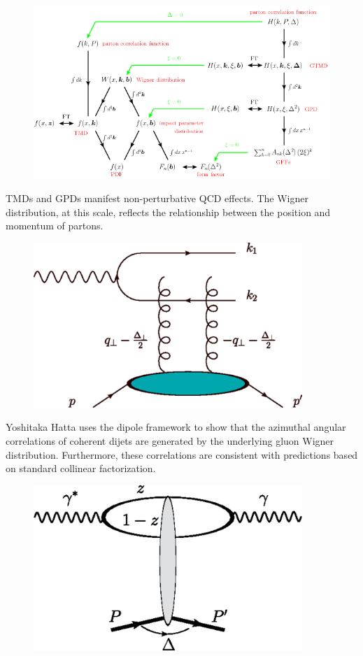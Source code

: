 \begin{figure}[h!]
\begin{centering}
\includegraphics[width=7in]{Chapter2/importfigs/fig6_introGPD_TMD.png}
\par\end{centering}
\end{figure}

TMDs and GPDs manifest non-perturbative QCD effects. The Wigner distribution, at this scale, reflects the relationship between the position and momentum of partons.

\begin{figure}[h!]
\begin{centering}
\includegraphics[width=4in]{Chapter2/importfigs/fig4_yatta.png}
\par\end{centering}
\end{figure}

Yoshitaka Hatta uses the dipole framework to show that the azimuthal angular correlations of coherent dijets are generated by the underlying gluon Wigner distribution. Furthermore, these correlations are consistent with predictions based on standard collinear factorization.

\begin{figure}[h!]
\begin{centering}
\includegraphics[width=4in]{Chapter2/importfigs/fig5_yatta_compton.png}
\par\end{centering}
\end{figure}


